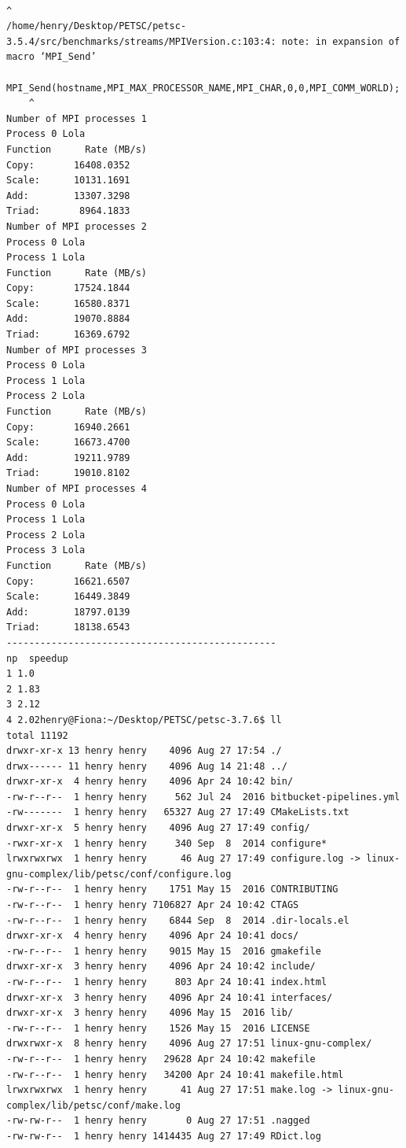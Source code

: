 \documentclass{article}
\begin{document}
\begin{enumerate}
\begin{verbatim}
                                                                           ^
/home/henry/Desktop/PETSC/petsc-3.5.4/src/benchmarks/streams/MPIVersion.c:103:4: note: in expansion of macro ‘MPI_Send’
    MPI_Send(hostname,MPI_MAX_PROCESSOR_NAME,MPI_CHAR,0,0,MPI_COMM_WORLD);
    ^
Number of MPI processes 1
Process 0 Lola
Function      Rate (MB/s) 
Copy:       16408.0352
Scale:      10131.1691
Add:        13307.3298
Triad:       8964.1833
Number of MPI processes 2
Process 0 Lola
Process 1 Lola
Function      Rate (MB/s) 
Copy:       17524.1844
Scale:      16580.8371
Add:        19070.8884
Triad:      16369.6792
Number of MPI processes 3
Process 0 Lola
Process 1 Lola
Process 2 Lola
Function      Rate (MB/s) 
Copy:       16940.2661
Scale:      16673.4700
Add:        19211.9789
Triad:      19010.8102
Number of MPI processes 4
Process 0 Lola
Process 1 Lola
Process 2 Lola
Process 3 Lola
Function      Rate (MB/s) 
Copy:       16621.6507
Scale:      16449.3849
Add:        18797.0139
Triad:      18138.6543
------------------------------------------------
np  speedup
1 1.0
2 1.83
3 2.12
4 2.02henry@Fiona:~/Desktop/PETSC/petsc-3.7.6$ ll
total 11192
drwxr-xr-x 13 henry henry    4096 Aug 27 17:54 ./
drwx------ 11 henry henry    4096 Aug 14 21:48 ../
drwxr-xr-x  4 henry henry    4096 Apr 24 10:42 bin/
-rw-r--r--  1 henry henry     562 Jul 24  2016 bitbucket-pipelines.yml
-rw-------  1 henry henry   65327 Aug 27 17:49 CMakeLists.txt
drwxr-xr-x  5 henry henry    4096 Aug 27 17:49 config/
-rwxr-xr-x  1 henry henry     340 Sep  8  2014 configure*
lrwxrwxrwx  1 henry henry      46 Aug 27 17:49 configure.log -> linux-gnu-complex/lib/petsc/conf/configure.log
-rw-r--r--  1 henry henry    1751 May 15  2016 CONTRIBUTING
-rw-r--r--  1 henry henry 7106827 Apr 24 10:42 CTAGS
-rw-r--r--  1 henry henry    6844 Sep  8  2014 .dir-locals.el
drwxr-xr-x  4 henry henry    4096 Apr 24 10:41 docs/
-rw-r--r--  1 henry henry    9015 May 15  2016 gmakefile
drwxr-xr-x  3 henry henry    4096 Apr 24 10:42 include/
-rw-r--r--  1 henry henry     803 Apr 24 10:41 index.html
drwxr-xr-x  3 henry henry    4096 Apr 24 10:41 interfaces/
drwxr-xr-x  3 henry henry    4096 May 15  2016 lib/
-rw-r--r--  1 henry henry    1526 May 15  2016 LICENSE
drwxrwxr-x  8 henry henry    4096 Aug 27 17:51 linux-gnu-complex/
-rw-r--r--  1 henry henry   29628 Apr 24 10:42 makefile
-rw-r--r--  1 henry henry   34200 Apr 24 10:41 makefile.html
lrwxrwxrwx  1 henry henry      41 Aug 27 17:51 make.log -> linux-gnu-complex/lib/petsc/conf/make.log
-rw-rw-r--  1 henry henry       0 Aug 27 17:51 .nagged
-rw-rw-r--  1 henry henry 1414435 Aug 27 17:49 RDict.log

\end{verbatim}
\end{enumerate}
\end{document}
